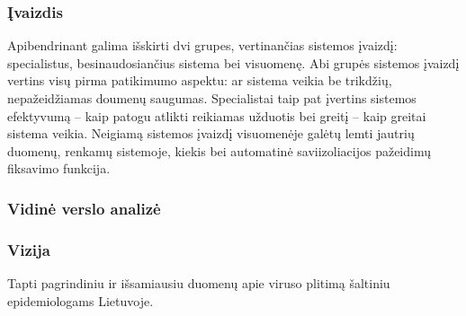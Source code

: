 \documentclass{VUMIFPSkursinis}
\begin{document}
\subsubsection{Įvaizdis}
Apibendrinant galima išskirti dvi grupes, vertinančias sistemos įvaizdį: specialistus, besinaudosiančius sistema
bei visuomenę. Abi grupės sistemos įvaizdį vertins visų pirma patikimumo aspektu: ar sistema veikia be trikdžių,
nepažeidžiamas doumenų saugumas. Specialistai taip pat įvertins sistemos efektyvumą -- kaip patogu atlikti reikiamas
užduotis bei greitį -- kaip greitai sistema veikia. Neigiamą sistemos įvaizdį visuomenėje galėtų lemti jautrių duomenų,
renkamų sistemoje, kiekis bei automatinė saviizoliacijos pažeidimų fiksavimo funkcija.

\begin{table}[]
	\centering
\end{table}

\subsubsection{Vidinė verslo analizė}

\subsubsection{Vizija}
Tapti pagrindiniu ir išsamiausiu duomenų apie viruso plitimą šaltiniu epidemiologams Lietuvoje.
\end{document}
